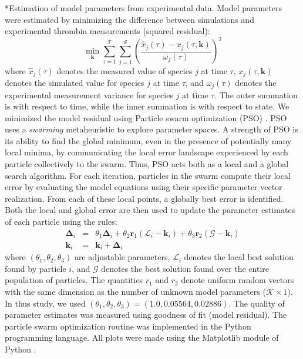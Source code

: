 \documentclass[12pt]{article}
\makeatletter
\renewcommand\subsection{\@startsection
	{subsection}{2}{0mm}
	{-0.05in}
	{-0.5\baselineskip}
	{\normalfont\normalsize\bfseries}}
\makeatother
\begin{document}
\subsection*{Estimation of model parameters from experimental data.}
Model parameters were estimated by minimizing the difference between simulations and experimental thrombin measurements (squared residual):
\begin{equation}\label{eqn:objective-function}
	\min_{\mathbf{k}} \sum_{\tau=1}^{\mathcal{T}}\sum_{j=1}^{\mathcal{S}}\left(\frac{\hat{x}_{j}\left(\tau\right) - x_{j}\left(\tau,\mathbf{k}\right)}{\omega_{j}\left(\tau\right)}\right)^{2}
\end{equation}where $\hat{x}_{j}\left(\tau\right)$ denotes the measured value of species $j$ at time $\tau$, $x_{j}\left(\tau,\mathbf{k}\right)$ denotes the simulated 
value for species $j$ at time $\tau$, and $\omega_{j}\left(\tau\right)$ denotes the experimental measurement variance for species $j$ at time $\tau$. The outer summation is with respect to
time, while the inner summation is with respect to state. We minimized the model residual using Particle swarm optimization (PSO) \citep{PSO}.
PSO uses a \textit{swarming} metaheuristic to explore parameter spaces. 
A strength of PSO is its ability to find the global minimum, even in the presence of potentially many local minima, by communicating the local
error landscape experienced by each particle collectively to the swarm. Thus, PSO acts both as a local and a global search algorithm. 
For each iteration, particles in the swarm compute their local error by evaluating the model equations using their specific parameter vector realization.
From each of these local points, a globally best error is identified. Both the local and global error 
are then used to update the parameter estimates of each particle using the rules:
\begin{eqnarray}
	\mathbf{\Delta}_{i} &=&\theta_{1}\mathbf{\Delta}_{i} + \theta_{2}\mathbf{r}_{1}\left(\mathcal{L}_{i} - \mathbf{k}_{i}\right) + \theta_{3}\mathbf{r}_{2}\left(\mathcal{G} - \mathbf{k}_{i}\right) \\
	\mathbf{k}_{i} &=& \mathbf{k}_{i} + \mathbf{\Delta}_{i}
\end{eqnarray}where $\left(\theta_{1},\theta_{2},\theta_{3}\right)$ are adjustable parameters, $\mathcal{L}_{i}$ denotes the local best solution found by particle $i$, and
$\mathcal{G}$ denotes the best solution found over the entire population of particles. The quantities $r_{1}$ and $r_{2}$ denote uniform random vectors with the same dimension as the number of unknown model
parameters ($\mathcal{K}\times{1}$). In thus study, we used $\left(\theta_{1},\theta_{2},\theta_{3}\right) = \left(1.0, 0.05564, 0.02886\right)$. The quality of parameter
estimates was measured using goodness of fit (model residual). The particle swarm optimization routine was implemented in the Python programming language. 
All plots were made using the Matplotlib module of Python \citep{Matplotlib}.
\end{document}
